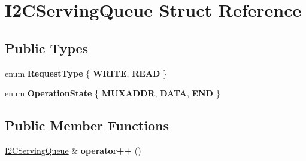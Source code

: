 \hypertarget{struct_i2_c_serving_queue}{}\section{I2\+C\+Serving\+Queue Struct Reference}
\label{struct_i2_c_serving_queue}
\subsection*{Public Types}
\begin{DoxyCompactItemize}
\item 
\mbox{\label{struct_i2_c_serving_queue_ac151fb41526295f72b356a5ad1bf335b}} 
enum {\bfseries Request\+Type} \{ {\bfseries W\+R\+I\+TE}, 
{\bfseries R\+E\+AD}
 \}
\item 
\mbox{\label{struct_i2_c_serving_queue_afeae9c0694dac7fb1ed477f9f453f671}} 
enum {\bfseries Operation\+State} \{ {\bfseries M\+U\+X\+A\+D\+DR}, 
{\bfseries D\+A\+TA}, 
{\bfseries E\+ND}
 \}
\end{DoxyCompactItemize}
\subsection*{Public Member Functions}
\begin{DoxyCompactItemize}
\item 
\mbox{\label{struct_i2_c_serving_queue_ab91f40d11c9c10f1b13bf48cb1429197}} 
\hyperlink{struct_i2_c_serving_queue}{I2\+C\+Serving\+Queue} \& {\bfseries operator++} ()
\end{DoxyCompactItemize}
